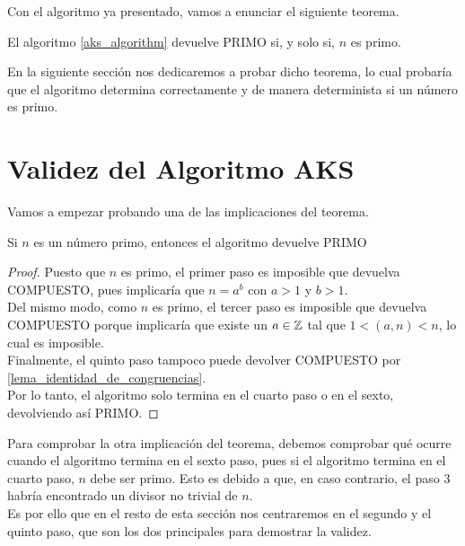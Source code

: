 Con el algoritmo ya presentado, vamos a enunciar el siguiente teorema.

\begin{teorema}\label{validez_algoritmo_aks}
	El algoritmo \ref{aks_algorithm} devuelve PRIMO si, y solo si, $n$ es primo.
\end{teorema}

En la siguiente sección nos dedicaremos a probar dicho teorema, lo cual probaría que el algoritmo determina correctamente y de manera determinista si un número es primo.

\section{Validez del Algoritmo AKS}

Vamos a empezar probando una de las implicaciones del teorema.

\begin{lema}\label{devuelve_PRIMO_si_n_primo}
	Si $n$ es un número primo, entonces el algoritmo devuelve PRIMO
\end{lema}

\begin{proof}
	Puesto que $n$ es primo, el primer paso es imposible que devuelva COMPUESTO, pues implicaría que $n = a^b$ con $a > 1$ y $b > 1$.\\
	
	Del mismo modo, como $n$ es primo, el tercer paso es imposible que devuelva COMPUESTO porque implicaría que existe un $a \in \mathbb{Z}$ tal que $1 < (a, n) < n$, lo cual es imposible.\\
	
	Finalmente, el quinto paso tampoco puede devolver COMPUESTO por \autoref{lema_identidad_de_congruencias}.\\
	
	Por lo tanto, el algoritmo solo termina en el cuarto paso o en el sexto, devolviendo así PRIMO.
\end{proof}

Para comprobar la otra implicación del teorema, debemos comprobar qué ocurre cuando el algoritmo termina en el sexto paso, pues si el algoritmo termina en el cuarto paso, $n$ debe ser primo. Esto es debido a que, en caso contrario, el paso $3$ habría encontrado un divisor no trivial de $n$.\\

Es por ello que en el resto de esta sección nos centraremos en el segundo y el quinto paso, que son los dos principales para demostrar la validez.\\

